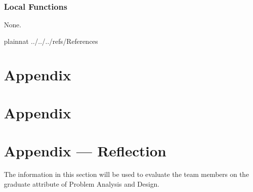 \documentclass[12pt, titlepage]{article}
\begin{document}
\subsubsection{Local Functions}
None.


\newpage

 {plainnat}
 {../../../refs/References}

\newpage

\section{Appendix} \label{Appendix}


\newpage{}

\section{Appendix} \label{Appendix}


\newpage{}

\section*{Appendix --- Reflection}

The information in this section will be used to evaluate the team members on the
graduate attribute of Problem Analysis and Design.


\end{document}
